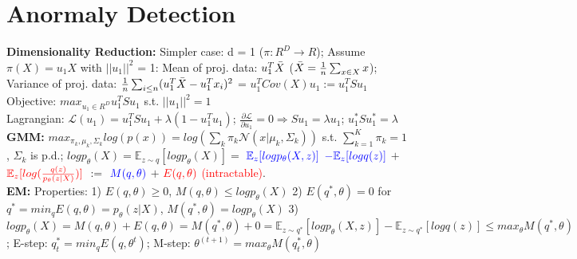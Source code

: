 \section{Anormaly Detection}
\textbf{Dimensionality Reduction: } 
Simpler case: d = 1 ($\pi: R^D \rightarrow R$); Assume  $\pi(X) = u_1 X$ with $||u_1||^2$ = 1: Mean of proj. data: $u_1^T \Bar{X}$ ($\Bar{X} = \frac{1}{n}\sum_{x \in X}x$); Variance of proj. data: $\frac{1}{n}\sum_{i \leq n}(u_1^T \Bar{X} - u_1^T x_i)^2$ = $u_1^T Cov(X) u_1 := u_1^T S u_1$
\\
Objective: $max_{u_1 \in R^D} u_1^T S u_1$ s.t. $||u_1||^2 = 1$
\\
Lagrangian: $\mathcal{L}(u_1) = u_1^T S u_1 + \lambda (1 - u_1^T u_1)$; $\frac{\partial\mathcal{L}}{\partial u_1} = 0 \Rightarrow S u_1 = \lambda u_1$; $u_1^* S u_1^* = \lambda$
\\
\textbf{GMM: } 
$max_{\pi_k, \mu_k, \Sigma_k} log(p(x)) = log(\sum_k \pi_k \mathcal{N}(x|\mu_k, \Sigma_k))$ s.t. $\sum_{k=1}^{K} \pi_k = 1$, $\Sigma_k$ is p.d.;
$log p_\theta (X) = \mathbb{E}_{z \sim q}[log p_\theta (X)] = $ $\color{blue}{\mathbb{E}_z[log p_\theta(X, z)]}$ $\color{blue}{- \mathbb{E}_z[log q(z)]}$ $+$ $\color{red}{\mathbb{E}_z[log(\frac{q(z)}{p_\theta (z|X)})]}$ $:=$ $\color{blue}{M(q, \theta)}$ $+$ $\color{red}{E(q, \theta)}$ \textcolor{red}{(intractable)}.
\\
\textbf{EM: } 
Properties: 1) $E(q, \theta) \geq 0$, $M(q, \theta) \leq log p_\theta(X)$
2) $E(q^*, \theta) = 0$ for $q^* = min_q E(q, \theta) = p_\theta (z|X)$, $M(q^*, \theta) = log p_\theta(X)$
3) $log p_\theta (X) = M(q, \theta) + E(q, \theta) = M(q^*, \theta) + 0 = \mathbb{E}_{z \sim q^*}[log p_\theta(X, z)] - \mathbb{E}_{z \sim q^*}[log q(z)] \leq max_\theta M(q^*, \theta)$; E-step: $q_t^* = min_q E(q, \theta^t)$; M-step: $\theta^{(t+1)} = max_\theta M(q_t^*, \theta)$